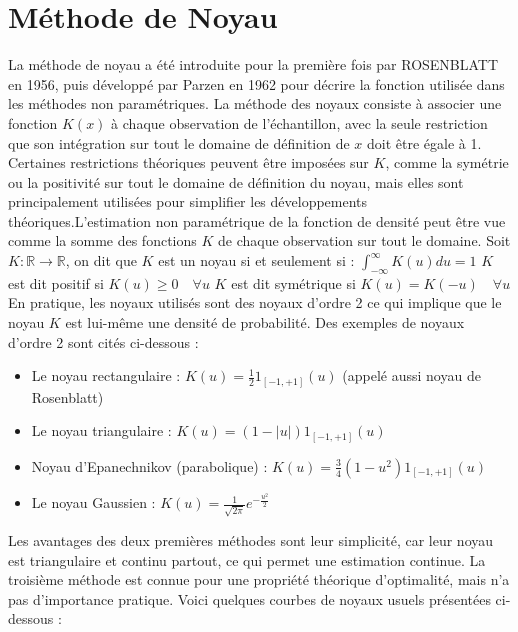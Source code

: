 \section{Méthode de Noyau}
La méthode de noyau a été introduite pour la première fois par ROSENBLATT en 1956, puis développé par Parzen en 1962 pour décrire la fonction utilisée dans les méthodes non paramétriques. La méthode des noyaux consiste à associer une fonction $K(x)$ à chaque observation de l'échantillon, avec la seule restriction que son intégration sur tout le domaine de définition de $x$ doit être égale à 1. Certaines restrictions théoriques peuvent être imposées sur $K$, comme la symétrie ou la positivité sur tout le domaine de définition du noyau, mais elles sont principalement utilisées pour simplifier les développements théoriques.\newline L'estimation non paramétrique de la fonction de densité peut être vue comme la somme des fonctions $K$ de chaque observation sur tout le domaine.
\newline
Soit $K: \mathbb{R} \longrightarrow \mathbb{R}$, on dit que $K$ est un noyau si et seulement si :
\newline
$\int_{-\infty}^{\infty} K(u)du=1$
\newline
$K$ est dit positif si $K(u) \geq 0 \quad \forall u$
\newline
$K$ est dit symétrique si $K(u) = K(-u) \quad \forall u$
\newline
\newline
En pratique, les noyaux utilisés sont des noyaux d'ordre 2 ce qui implique que le noyau $K$ est lui-même une densité de probabilité. Des exemples de noyaux d'ordre 2 sont cités ci-dessous :
\begin{itemize}
    \item Le noyau rectangulaire : $K(u)=\frac{1}{2}1_{[-1,+1]}(u)$ (appelé aussi noyau de Rosenblatt)
    \item Le noyau triangulaire : $K(u)=(1-|u|)1_{[-1,+1]}(u)$
    \item Noyau d’Epanechnikov (parabolique) : $K(u)=\frac{3}{4}(1-u^2)1_{[-1,+1]}(u)$
    \item Le noyau Gaussien : $K(u)=\frac{1}{\sqrt{2\pi}}e^{-\frac{u^2}{2}}$
\end{itemize}
Les avantages des deux premières méthodes sont leur simplicité, car leur noyau est triangulaire et continu partout, ce qui permet une estimation continue. La troisième méthode est connue pour une propriété théorique d'optimalité, mais n'a pas d'importance pratique.
\newline
Voici quelques courbes de noyaux usuels présentées ci-dessous :

